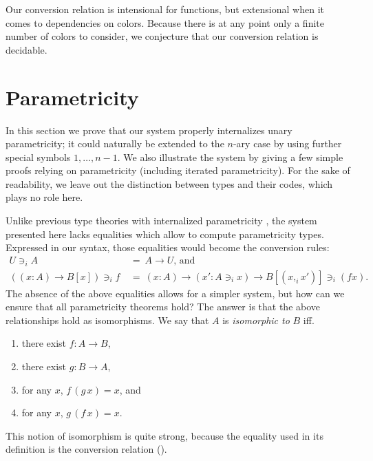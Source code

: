 \documentclass[english]{PaperTools/latex/entcs}
\theoremstyle{plain}
\theoremstyle{definition}
\theoremstyle{remark}
\newcommand\CP[3]{(#2,_{#1} #3)}
\newcommand\op[1]{∋_{#1}}
\begin{document}
Our conversion relation is intensional for functions, but extensional
when it comes to dependencies on colors. Because there is at any point
only a finite number of colors to consider, we conjecture that our
conversion relation is decidable.

\section{Parametricity}
\label{sec:parametricity}
In this section we prove that our system properly internalizes unary
parametricity; it could naturally be extended to the $n$-ary case by
using further special symbols $1,…,n-1$.
We also illustrate the system by giving a few simple
proofs relying on parametricity (including iterated parametricity).
For the sake of readability, we leave out the distinction between types
and their codes, which plays no role here.

Unlike previous type theories with internalized parametricity
\citep{bernardy_computational_2012, bernardy_type-theory_2013}, the
system presented here lacks equalities which allow to compute
parametricity types. Expressed in our syntax, those equalities would
become the conversion rules:
\begin{align*}
  U \op i A              &~=~ A → U\text{, and} \\
  ((x:A) → B[x]) \op i f &~=~ (x:A) → (x' : A \op i x) → B[\CP i x {x'}] \op i (f x)\text{.}
\end{align*}
%
The absence of the above equalities allows for a simpler system, but
how can we ensure that all parametricity theorems hold?  The answer is
that the above relationships hold as isomorphisms.
%
We say that $A$ is \emph{isomorphic to} $B$ iff.
\begin{multicols}{2}
\begin{enumerate}
  \item there exist $f : A → B$,
  \item there exist $g : B → A$,
  \item for any $x$, $f\, (g\, x) = x$, and
  \item for any $x$, $g\, (f\, x) = x$.
\end{enumerate}
\end{multicols}
This notion of isomorphism is quite strong, because the equality used
in its definition is the conversion relation ().
\end{document}
